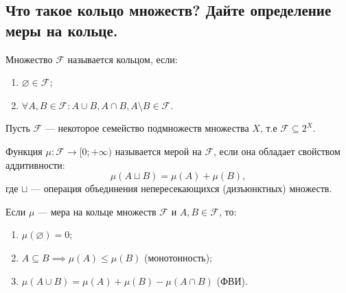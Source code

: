 
\subsection{Что такое кольцо множеств? Дайте определение меры на кольце.}
    
    \begin{definition}[Маевский]
        Множество $\mathcal{F}$ называется кольцом, если:\\[-25 pt]
        \begin{enumerate}
            \item $\varnothing \in \mathcal{F}$;
            \item $\forall A,  B \in \mathcal{F} : A \cup B, A \cap B, A \setminus B \in \mathcal{F}$.
        \end{enumerate}
    \end{definition}

    \begin{definition}
        Пусть $\mathcal{F}$ --- некоторое семейство подмножеств множества $X$, 
        т.е $\mathcal{F} \subseteq 2^X$.
        
        Функция $\mu : \mathcal{F} \to [0; +\infty)$ называется мерой на $\mathcal{F}$, 
        если она обладает свойством аддитивности:
        \[ \mu(A \sqcup B) = \mu(A) + \mu(B), \]
        где $\sqcup$ --- операция объединения непересекающихся (дизъюнктных) множеств.
    \end{definition}
        
    \begin{properties}
        Если $\mu$ --- мера на кольце множеств $\mathcal{F}$ и $A, B \in \mathcal{F}$, то:\\[-25 pt]
        \begin{enumerate}
            \item $\mu(\varnothing) = 0$;
            \item $A \subseteq B \implies \mu(A) \le \mu(B)$ (монотонность);
            \item $\mu(A \cup B) = \mu(A) + \mu(B) - \mu(A \cap B)$ (ФВИ).
        \end{enumerate}
    \end{properties}
